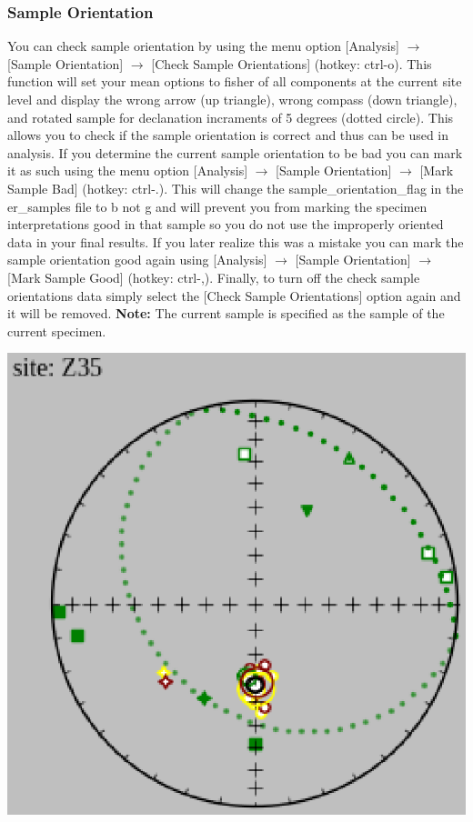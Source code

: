 \documentclass[11pt]{book}
\begin{document}
{{\subsubsection{Sample Orientation}\label{sample-orient}

You can check sample orientation by using the menu option [Analysis] $\rightarrow$ [Sample Orientation] $\rightarrow$ [Check Sample Orientations] (hotkey: ctrl-o). This function will set your mean options to fisher of all components at the current site level and display the wrong arrow (up triangle), wrong compass (down triangle), and rotated sample for declanation incraments of 5 degrees (dotted circle). This allows you to check if the sample orientation is correct and thus can be used in analysis. If you determine the current sample orientation to be bad you can mark it as such using the menu option [Analysis] $\rightarrow$ [Sample Orientation] $\rightarrow$ [Mark Sample Bad] (hotkey: ctrl-.). This will change the sample_orientation_flag in the er_samples file to b not g and will prevent you from marking the specimen interpretations good in that sample so you do not use the improperly oriented data in your final results. If you later realize this was a mistake you can mark the sample orientation good again using [Analysis] $\rightarrow$ [Sample Orientation] $\rightarrow$ [Mark Sample Good] (hotkey: ctrl-,). Finally, to turn off the check sample orientations data simply select the [Check Sample Orientations] option again and it will be removed. \textbf{Note:} The current sample is specified as the sample of the current specimen.

\includegraphics[width=10 cm]{EPSFiles/demag_gui_CheckSampleOrient.eps}

}}
\end{document}
